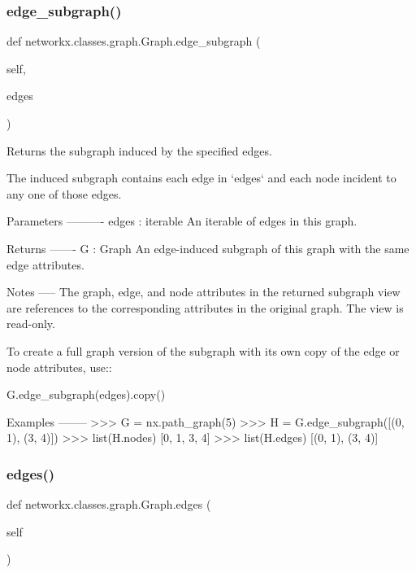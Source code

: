 \subsubsection{\texorpdfstring{edge\+\_\+subgraph()}{edge\_subgraph()}}
{\footnotesize\ttfamily def networkx.\+classes.\+graph.\+Graph.\+edge\+\_\+subgraph (\begin{DoxyParamCaption}\item[{}]{self,  }\item[{}]{edges }\end{DoxyParamCaption})}

\begin{DoxyVerb}Returns the subgraph induced by the specified edges.

The induced subgraph contains each edge in `edges` and each
node incident to any one of those edges.

Parameters
----------
edges : iterable
    An iterable of edges in this graph.

Returns
-------
G : Graph
    An edge-induced subgraph of this graph with the same edge
    attributes.

Notes
-----
The graph, edge, and node attributes in the returned subgraph
view are references to the corresponding attributes in the original
graph. The view is read-only.

To create a full graph version of the subgraph with its own copy
of the edge or node attributes, use::

    G.edge_subgraph(edges).copy()

Examples
--------
>>> G = nx.path_graph(5)
>>> H = G.edge_subgraph([(0, 1), (3, 4)])
>>> list(H.nodes)
[0, 1, 3, 4]
>>> list(H.edges)
[(0, 1), (3, 4)]\end{DoxyVerb}
 \mbox{\label{classnetworkx_1_1classes_1_1graph_1_1Graph_a82640e2156b34c7c6c64c9bcb0295521}} 
\subsubsection{\texorpdfstring{edges()}{edges()}}
{\footnotesize\ttfamily def networkx.\+classes.\+graph.\+Graph.\+edges (\begin{DoxyParamCaption}\item[{}]{self }\end{DoxyParamCaption})}

